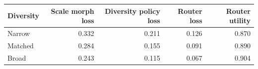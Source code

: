 \begin{tabular}{lrrrr}
\toprule
Diversity & Scale morph loss & Diversity policy loss & Router loss & Router utility \\
\midrule
Narrow & 0.332 & 0.211 & 0.126 & 0.870 \\
Matched & 0.284 & 0.155 & 0.091 & 0.890 \\
Broad & 0.243 & 0.115 & 0.067 & 0.904 \\
\bottomrule
\end{tabular}
